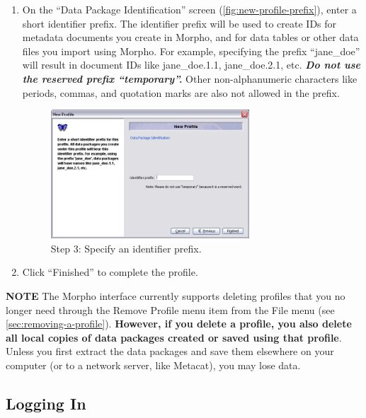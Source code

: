 \begin{enumerate}
  \item On the ``Data Package Identification'' screen
    (\autoref{fig:new-profile-prefix}), enter a short identifier prefix.
    The identifier prefix will be used to create IDs for metadata
    documents you create in Morpho, and for data tables or other data
    files you import using Morpho. For example, specifying the prefix
    ``jane\_doe'' will result in document IDs like jane\_doe.1.1,
    jane\_doe.2.1, etc. \emph{\textbf{Do not use the reserved prefix
    ``temporary''.}} Other non-alphanumeric characters like periods, 
    commas, and quotation marks are also not allowed in the prefix.

  \begin{figure}
    \centering
      \includegraphics[width=0.7\textwidth]{images/new-profile-prefix.png}
    \caption{Step 3: Specify an identifier prefix.}
    \label{fig:new-profile-prefix}
  \end{figure}

  \item Click ``Finished'' to complete the profile.
\end{enumerate}

\begin{shaded}
  \textbf{NOTE} The Morpho interface currently supports deleting
  profiles that you no longer need through the Remove Profile menu item
  from the File menu (see \autoref{sec:removing-a-profile}).
   \textbf{However, if you delete a profile, you also
  delete all local copies of data packages created or saved using that
  profile}. Unless you first extract the data packages and save them
  elsewhere on your computer (or to a network server, like Metacat), you
  may lose data.
\end{shaded}

\subsection{Logging In}


